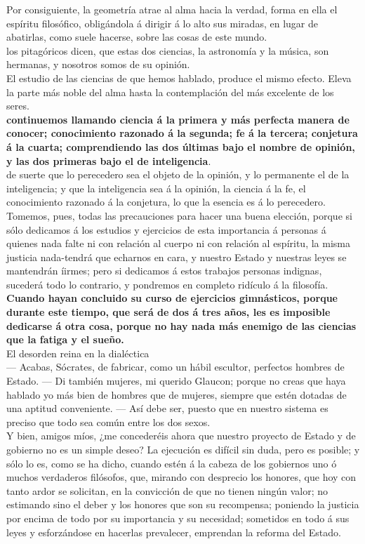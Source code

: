 \documentclass[10pt]{book}
\begin{document}
Por consiguiente, la geometría atrae al alma hacia la verdad, forma en ella el espíritu filosófico, obligándola á dirigir á lo alto sus miradas, en lugar de abatirlas, como suele hacerse, sobre las cosas de este mundo. \\
los pitagóricos dicen, que estas dos ciencias, la astronomía y la música, son hermanas, y nosotros
somos de su opinión.\\
El estudio de las ciencias de que hemos hablado, produce el mismo efecto. Eleva la parte más noble del alma hasta la contemplación del más excelente de los seres.\\
\textbf{continuemos llamando ciencia á la primera y más perfecta manera de conocer; conocimiento razonado á la segunda; fe á la tercera; conjetura á la cuarta; comprendiendo las dos últimas bajo el nombre de opinión, y las dos primeras bajo el de inteligencia}.\\
de suerte que lo perecedero sea el objeto de la opinión, y lo permanente el de la inteligencia; y que la inteligencia sea á la opinión, la ciencia á la fe, el conocimiento razonado á la conjetura, lo que la esencia es á lo perecedero. \\
Tomemos, pues, todas las precauciones para hacer una buena elección, porque si sólo dedicamos á los estudios y ejercicios de esta importancia á personas á quienes nada falte ni con relación al cuerpo ni con relación al espíritu, la misma justicia nada-tendrá que echarnos en cara, y nuestro Estado y nuestras leyes se mantendrán íirmes; pero si dedicamos á estos trabajos personas indignas, sucederá todo lo contrario, y pondremos en completo ridículo á la filosofía. \\
\textbf{ Cuando hayan concluido su curso de ejercicios gimnásticos, porque durante este tiempo, que será de dos á tres años, les es imposible dedicarse á otra cosa, porque no hay nada más enemigo de las ciencias que la fatiga y el sueño. }\\
El desorden reina en la  dialéctica\\
— Acabas, Sócrates, de fabricar, como un hábil escultor, perfectos hombres de Estado. — Di también mujeres, mi querido Glaucon; porque no creas que haya hablado yo más bien de hombres que de mujeres, siempre que estén dotadas de una aptitud conveniente. — Así debe ser, puesto que en nuestro sistema es preciso que todo sea común entre los dos sexos. \\
Y bien, amigos míos, ¿me concederéis ahora que nuestro proyecto de Estado y de gobierno no es un simple deseo? La ejecución es difícil sin duda, pero es posible; y sólo lo es, como se ha dicho, cuando estén á la cabeza de los gobiernos uno ó muchos verdaderos filósofos, que, mirando con desprecio los honores, que hoy con tanto ardor se solicitan, en la convicción de que no tienen ningún valor; no estimando sino el deber y los honores que son su recompensa; poniendo la justicia por encima de todo por su importancia y su necesidad; sometidos en todo á sus leyes y esforzándose en hacerlas prevalecer, emprendan la reforma del Estado. 
\end{document}
